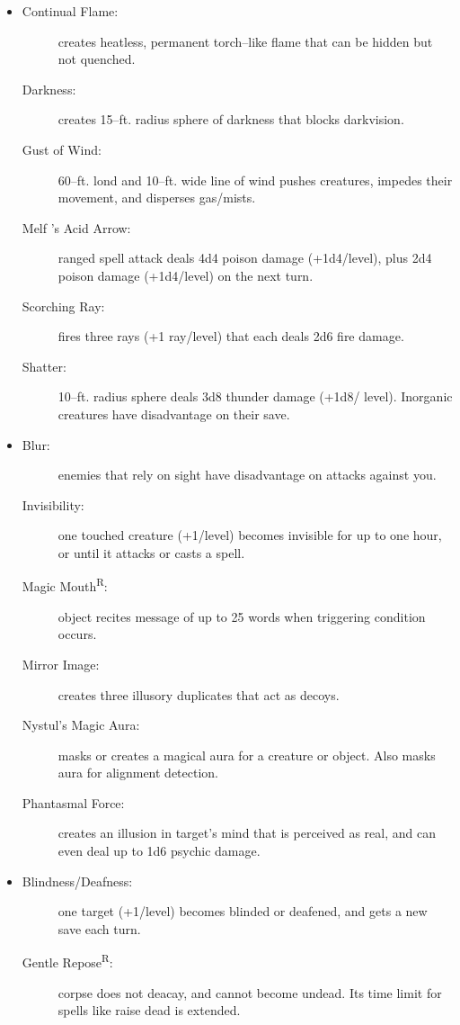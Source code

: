 \documentclass[DIV=14, paper=a4, fontsize=12pt, twocolumn, twoside]{scrartcl}
\begin{document}
\begin{itemize}[align=parleft,labelwidth=1cm]
\begin{description}
\end{description}
\renewcommand{\labelitemi}{Evoc}\item
\begin{description}
 \item[Continual Flame:] creates heatless, permanent torch–like flame that can be hidden but not quenched.
 \item[Darkness:] creates 15–ft. radius sphere of darkness that blocks darkvision.
 \item[Gust of Wind:] 60–ft. lond and 10–ft. wide line of wind pushes creatures, impedes their movement, and disperses gas/mists.
 \item[Melf ’s Acid Arrow:] ranged spell attack deals 4d4 poison damage (+1d4/level), plus 2d4 poison damage (+1d4/level) on the next turn.
 \item[Scorching Ray:] fires three rays (+1 ray/level) that each deals 2d6 fire damage.
 \item[Shatter:] 10–ft. radius sphere deals 3d8 thunder damage (+1d8/ level). Inorganic creatures have disadvantage on their save.
\end{description}
\renewcommand{\labelitemi}{Illus}\item
\begin{description}
 \item[Blur:] enemies that rely on sight have disadvantage on attacks against you.
 \item[Invisibility:] one touched creature (+1/level) becomes invisible for up to one hour, or until it attacks or casts a spell.
 \item[Magic Mouth\textsuperscript{R}:] object recites message of up to 25 words when triggering condition occurs.
 \item[Mirror Image:] creates three illusory duplicates that act as decoys.
 \item[Nystul’s Magic Aura:] masks or creates a magical aura for a creature or object. Also masks aura for alignment detection.
 \item[Phantasmal Force:] creates an illusion in target’s mind that is perceived as real, and can even deal up to 1d6 psychic damage. 
\end{description}
\renewcommand{\labelitemi}{Necro}\item
\begin{description}
 \item[Blindness/Deafness:] one target (+1/level) becomes blinded or deafened, and gets a new save each turn.
 \item[Gentle Repose\textsuperscript{R}:] corpse does not deacay, and cannot become undead. Its time limit for spells like raise dead is extended.

\end{description}
\end{itemize}
\end{document}
